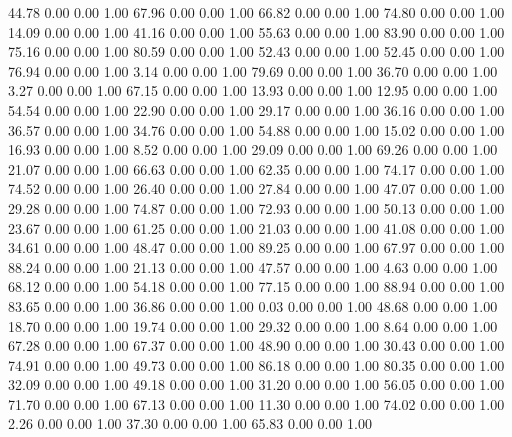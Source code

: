    44.78   0.00   0.00   1.00
   67.96   0.00   0.00   1.00
   66.82   0.00   0.00   1.00
   74.80   0.00   0.00   1.00
   14.09   0.00   0.00   1.00
   41.16   0.00   0.00   1.00
   55.63   0.00   0.00   1.00
   83.90   0.00   0.00   1.00
   75.16   0.00   0.00   1.00
   80.59   0.00   0.00   1.00
   52.43   0.00   0.00   1.00
   52.45   0.00   0.00   1.00
   76.94   0.00   0.00   1.00
    3.14   0.00   0.00   1.00
   79.69   0.00   0.00   1.00
   36.70   0.00   0.00   1.00
    3.27   0.00   0.00   1.00
   67.15   0.00   0.00   1.00
   13.93   0.00   0.00   1.00
   12.95   0.00   0.00   1.00
   54.54   0.00   0.00   1.00
   22.90   0.00   0.00   1.00
   29.17   0.00   0.00   1.00
   36.16   0.00   0.00   1.00
   36.57   0.00   0.00   1.00
   34.76   0.00   0.00   1.00
   54.88   0.00   0.00   1.00
   15.02   0.00   0.00   1.00
   16.93   0.00   0.00   1.00
    8.52   0.00   0.00   1.00
   29.09   0.00   0.00   1.00
   69.26   0.00   0.00   1.00
   21.07   0.00   0.00   1.00
   66.63   0.00   0.00   1.00
   62.35   0.00   0.00   1.00
   74.17   0.00   0.00   1.00
   74.52   0.00   0.00   1.00
   26.40   0.00   0.00   1.00
   27.84   0.00   0.00   1.00
   47.07   0.00   0.00   1.00
   29.28   0.00   0.00   1.00
   74.87   0.00   0.00   1.00
   72.93   0.00   0.00   1.00
   50.13   0.00   0.00   1.00
   23.67   0.00   0.00   1.00
   61.25   0.00   0.00   1.00
   21.03   0.00   0.00   1.00
   41.08   0.00   0.00   1.00
   34.61   0.00   0.00   1.00
   48.47   0.00   0.00   1.00
   89.25   0.00   0.00   1.00
   67.97   0.00   0.00   1.00
   88.24   0.00   0.00   1.00
   21.13   0.00   0.00   1.00
   47.57   0.00   0.00   1.00
    4.63   0.00   0.00   1.00
   68.12   0.00   0.00   1.00
   54.18   0.00   0.00   1.00
   77.15   0.00   0.00   1.00
   88.94   0.00   0.00   1.00
   83.65   0.00   0.00   1.00
   36.86   0.00   0.00   1.00
    0.03   0.00   0.00   1.00
   48.68   0.00   0.00   1.00
   18.70   0.00   0.00   1.00
   19.74   0.00   0.00   1.00
   29.32   0.00   0.00   1.00
    8.64   0.00   0.00   1.00
   67.28   0.00   0.00   1.00
   67.37   0.00   0.00   1.00
   48.90   0.00   0.00   1.00
   30.43   0.00   0.00   1.00
   74.91   0.00   0.00   1.00
   49.73   0.00   0.00   1.00
   86.18   0.00   0.00   1.00
   80.35   0.00   0.00   1.00
   32.09   0.00   0.00   1.00
   49.18   0.00   0.00   1.00
   31.20   0.00   0.00   1.00
   56.05   0.00   0.00   1.00
   71.70   0.00   0.00   1.00
   67.13   0.00   0.00   1.00
   11.30   0.00   0.00   1.00
   74.02   0.00   0.00   1.00
    2.26   0.00   0.00   1.00
   37.30   0.00   0.00   1.00
   65.83   0.00   0.00   1.00
